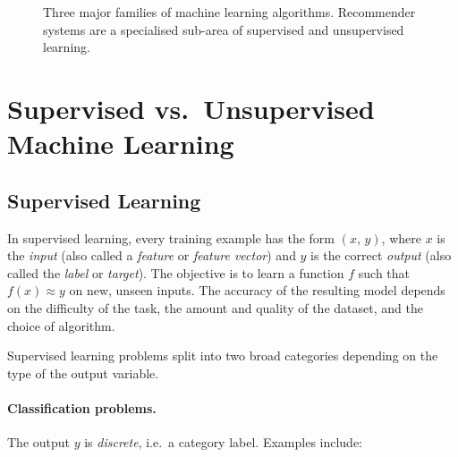 \begin{figure}[h]
\centering
{}
\caption{Three major families of machine learning algorithms.
Recommender systems are a specialised sub-area of supervised and unsupervised
learning.}
\label{fig:ml-families}
\end{figure}

\section{Supervised vs.\ Unsupervised Machine Learning}

\subsection{Supervised Learning}

In supervised learning, every training example has the form $(x,\,y)$, where
$x$ is the \emph{input} (also called a \emph{feature} or \emph{feature vector})
and $y$ is the correct \emph{output} (also called the \emph{label} or
\emph{target}). The objective is to learn a function $f$ such that
$f(x) \approx y$ on new, unseen inputs. The accuracy of the resulting model
depends on the difficulty of the task, the amount and quality of the dataset,
and the choice of algorithm.

Supervised learning problems split into two broad categories depending on the
type of the output variable.

\paragraph{Classification problems.}
The output $y$ is \emph{discrete}, i.e.\ a category label. Examples include:

